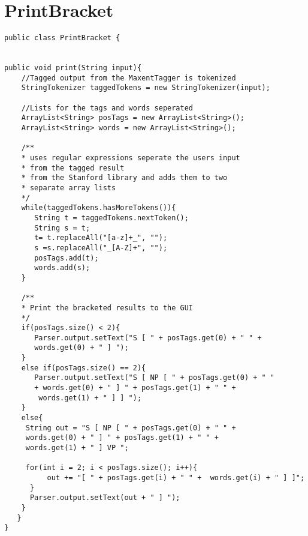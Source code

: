 \section{PrintBracket}
\begin{lstlisting}
public class PrintBracket {


public void print(String input){
	//Tagged output from the MaxentTagger is tokenized
	StringTokenizer taggedTokens = new StringTokenizer(input);

	//Lists for the tags and words seperated
	ArrayList<String> posTags = new ArrayList<String>();
	ArrayList<String> words = new ArrayList<String>();

	/**
	* uses regular expressions seperate the users input
	* from the tagged result
	* from the Stanford library and adds them to two 
	* separate array lists
	*/
	while(taggedTokens.hasMoreTokens()){
	   String t = taggedTokens.nextToken();
	   String s = t;
	   t= t.replaceAll("[a-z]+_", "");
	   s =s.replaceAll("_[A-Z]+", "");
	   posTags.add(t);
	   words.add(s);
	}

	/**
	* Print the bracketed results to the GUI
	*/
	if(posTags.size() < 2){
	   Parser.output.setText("S [ " + posTags.get(0) + " " + 
	   words.get(0) + " ] ");
	}
	else if(posTags.size() == 2){
	   Parser.output.setText("S [ NP [ " + posTags.get(0) + " " 
	   + words.get(0) + " ] " + posTags.get(1) + " " +
	    words.get(1) + " ] ] ");
	}
	else{
	 String out = "S [ NP [ " + posTags.get(0) + " " + 
	 words.get(0) + " ] " + posTags.get(1) + " " + 
	 words.get(1) + " ] VP ";
	   
	 for(int i = 2; i < posTags.size(); i++){
	      out += "[ " + posTags.get(i) + " " +  words.get(i) + " ] ]";
	  }
   	  Parser.output.setText(out + " ] ");
	}
   }
}

\end{lstlisting}





